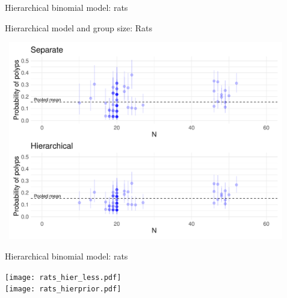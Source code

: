 \documentclass[finnish,english,t]{beamer}
\begin{document}
\begin{frame}{Hierarchical binomial model: rats}


\end{frame}

\begin{frame}{Hierarchical model and group size: Rats}

  \vspace{-\baselineskip}
   \begin{minipage}[b]{12cm}
    {  \hspace{-0.7cm}~\includegraphics[width=12cm]{rats_shrinkage_size.pdf}}
   \end{minipage}
  
\end{frame}

\begin{frame}{Hierarchical binomial model: rats}

  {\vspace{-0.3\baselineskip}
    \texttt{[image: rats\_hier\_less.pdf]}\\}
  {\vspace{-0.3\baselineskip}
    \texttt{[image: rats\_hierprior.pdf]}\\}

\end{frame}
\end{document}
